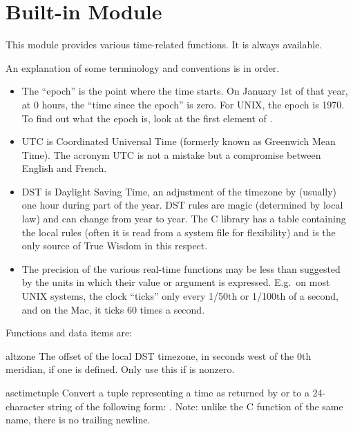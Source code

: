 \section{Built-in Module }

This module provides various time-related functions.
It is always available.

An explanation of some terminology and conventions is in order.

\begin{itemize}

\item
The ``epoch'' is the point where the time starts.  On January 1st of that
year, at 0 hours, the ``time since the epoch'' is zero.  For UNIX, the
epoch is 1970.  To find out what the epoch is, look at the first
element of .

\item
UTC is Coordinated Universal Time (formerly known as Greenwich Mean
Time).  The acronym UTC is not a mistake but a compromise between
English and French.

\item
DST is Daylight Saving Time, an adjustment of the timezone by
(usually) one hour during part of the year.  DST rules are magic
(determined by local law) and can change from year to year.  The C
library has a table containing the local rules (often it is read from
a system file for flexibility) and is the only source of True Wisdom
in this respect.

\item
The precision of the various real-time functions may be less than
suggested by the units in which their value or argument is expressed.
E.g.\ on most UNIX systems, the clock ``ticks'' only every 1/50th or
1/100th of a second, and on the Mac, it ticks 60 times a second.

\end{itemize}

Functions and data items are:

\renewcommand{\indexsubitem}{(in module time)}

\begin{datadesc}{altzone}
The offset of the local DST timezone, in seconds west of the 0th
meridian, if one is defined.  Only use this if  is
nonzero.
\end{datadesc}


\begin{funcdesc}{asctime}{tuple}
Convert a tuple representing a time as returned by  or
 to a 24-character string of the following form:
.  Note: unlike the C function of
the same name, there is no trailing newline.
\end{funcdesc}


